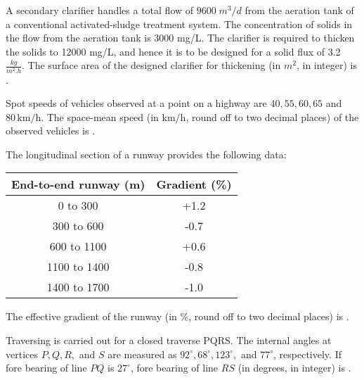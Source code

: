 \item 
A secondary clarifier handles a total flow of $9600\;m^3/d$ from the aeration tank of a conventional activated-sludge treatment system. The concentration of solids in the flow from the aeration tank is 3000 mg/L. The clarifier is required to thicken the solids to 12000 mg/L, and hence it is to be designed for a solid flux of 3.2 $\frac{kg}{m^2.h}$. The surface area of the designed clarifier for thickening (in $m^2$, in integer) is  \underline{\hspace{2cm}}.

\bigskip

\item 
Spot speeds of vehicles observed at a point on a highway are $40, 55, 60, 65$ and $80 \, \text{km/h}$. The space-mean speed (in km/h, round off to two decimal places) of the observed vehicles is \underline{\hspace{2cm}}.

\bigskip

\item 
The longitudinal section of a runway provides the following data:

\begin{table}[!ht]    
  \centering
  \begin{tabular}{|c|c|}
\hline
\textbf{End-to-end runway (m)} & \textbf{Gradient (\%)} \\
\hline
0 to 300 & +1.2 \\
300 to 600 & -0.7 \\
600 to 1100 & +0.6 \\
1100 to 1400 & -0.8 \\
1400 to 1700 & -1.0 \\
\hline
\end{tabular}
\end{table}

The effective gradient of the runway (in \%, round off to two decimal places) is \underline{\hspace{2cm}}.

\bigskip

\item 
Traversing is carried out for a closed traverse PQRS. The internal angles at vertices $P, Q, R,$ and $S$ are measured as $92^\circ, 68^\circ, 123^\circ,$ and $77^\circ$, respectively. If fore bearing of line $PQ$ is $27^\circ$, fore bearing of line $RS$ (in degrees, in integer) is \underline{\hspace{2cm}}.


